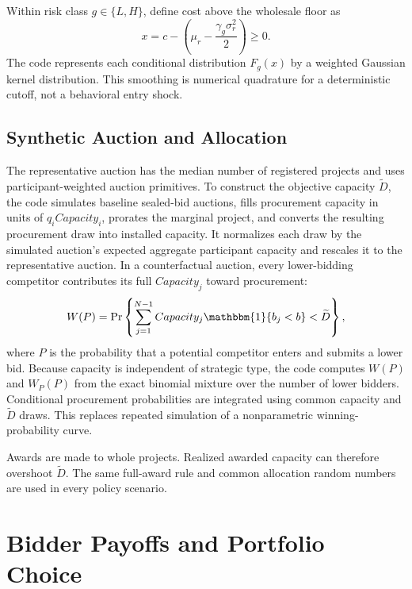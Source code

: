 \documentclass[10pt]{article}
\begin{document}
Within risk class $g\in\{L,H\}$, define cost above the wholesale floor as
\begin{equation}
x=c-\left(\mu_r-\frac{\gamma_g\sigma_r^2}{2}\right)\geq0.
\label{eq:x_type}
\end{equation}
The code represents each conditional distribution $F_g(x)$ by a weighted
Gaussian kernel distribution.  This smoothing is numerical quadrature for a
deterministic cutoff, not a behavioral entry shock.

\subsection{Synthetic Auction and Allocation}

The representative auction has the median number of registered projects and
uses participant-weighted auction primitives.  To construct the objective
capacity $\widetilde D$, the code simulates baseline sealed-bid auctions,
fills procurement capacity in units of $q_iCapacity_i$, prorates the marginal
project, and converts the resulting procurement draw into installed capacity.
It normalizes each draw by the simulated auction's expected aggregate
participant capacity and rescales it to the representative auction.  In a
counterfactual auction, every lower-bidding competitor contributes its full
$Capacity_j$ toward procurement:
\begin{equation}
W(P)=\Pr\left\{
\sum_{j=1}^{N-1}Capacity_j\mathbbm{1}\{b_j<b\}<\widetilde D
\right\},
\label{eq:winprob}
\end{equation}
where $P$ is the probability that a potential competitor enters and submits a
lower bid.  Because capacity is independent of strategic type, the code
computes $W(P)$ and $W_P(P)$ from the exact binomial mixture over the number of
lower bidders.  Conditional procurement probabilities are integrated using
common capacity and $\widetilde D$ draws.  This replaces repeated simulation
of a nonparametric winning-probability curve.

Awards are made to whole projects.  Realized awarded capacity can therefore
overshoot $\widetilde D$.  The same full-award rule and common allocation
random numbers are used in every policy scenario.

\section{Bidder Payoffs and Portfolio Choice}
\end{document}
